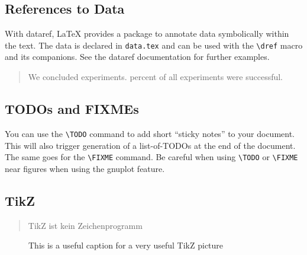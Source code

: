 \subsection{References to Data}

With dataref, \LaTeX{}
provides a package to annotate data symbolically within the text. The
data is declared in \verb|data.tex| and can be used with the
\verb|\dref| macro and its companions. See the dataref documentation
for further examples.

\begin{quote}
  We concluded 
  experiments.  percent of all experiments
  were successful.
\end{quote}

\subsection{TODOs and FIXMEs}

You can use the \verb|\TODO| command to add short ``sticky notes'' to your document. 
This will also trigger generation of a list-of-TODOs at the end of the document. 
The same goes for the \verb|\FIXME| command.
Be careful when using \verb|\TODO| or \verb|\FIXME| near figures when using the gnuplot feature.

\subsection{TikZ}

\begin{quote}
  TikZ ist kein Zeichenprogramm
\end{quote}

\begin{figure}[h]\centering
{}
\caption{This is a useful caption for a very useful TikZ picture}
\end{figure}
